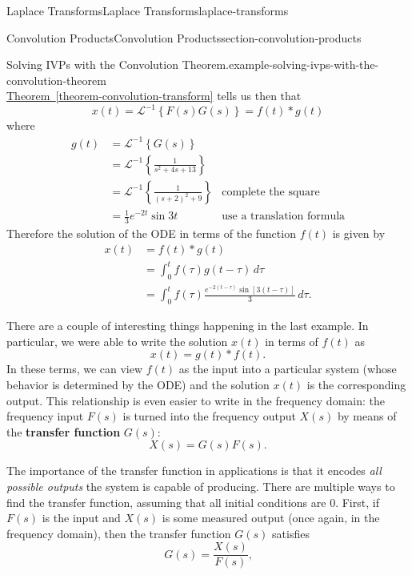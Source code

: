 \documentclass[oneside,10pt,]{book}
\newcommand{\terminology}[1]{\textbf{#1}}
\numberwithin{equation}{section}
\newcommand{\Int}[2]{\int_{#1}^{#2}}
\newcommand{\iLaplace}[1]{\mathcal{L}^{-1}\left\{#1\right\}}
\newcommand{\amp}{&}
\begin{document}
\begin{chapterptx}{Laplace Transforms}{}{Laplace Transforms}{}{}{laplace-transforms}
\begin{sectionptx}{Convolution Products}{}{Convolution Products}{}{}{section-convolution-products}
\begin{example}{Solving IVPs with the Convolution Theorem.}{example-solving-ivps-with-the-convolution-theorem}
\begin{equation*}
\end{equation*}
\hyperref[theorem-convolution-transform]{Theorem~\ref{theorem-convolution-transform}} tells us then that%
\begin{equation*}
x(t) = \iLaplace{F(s)G(s)} = f(t)*g(t)
\end{equation*}
where%
\begin{align*}
g(t) \amp= \iLaplace{G(s)}\\
\amp= \iLaplace{\frac{1}{s^{2}+4s+13}} \\
\amp= \iLaplace{\frac{1}{(s+2)^{2}+9}} \amp \text{complete the square}\\
\amp= \frac{1}{3}e^{-2t}\sin3t \amp \text{use a translation formula}
\end{align*}
Therefore the solution of the ODE in terms of the function \(f(t)\) is given by%
\begin{align*}
x(t) \amp= f(t)\ast g(t)\\
\amp= \Int{0}{t}f(\tau)g(t-\tau)\,d\tau\\
\amp= \int_{0}^{t}f(\tau)\frac{e^{-2(t-\tau)}\sin[3(t-\tau)]}{3}\,d\tau\text{.}
\end{align*}
%
\end{example}
\hypertarget{p-566}{}%
There are a couple of interesting things happening in the last example. In particular, we were able to write the solution \(x(t)\) in terms of \(f(t)\) as%
\begin{equation*}
x(t) = g(t)\ast f(t)\text{.}
\end{equation*}
In these terms, we can view \(f(t)\) as the input into a particular system (whose behavior is determined by the ODE) and the solution \(x(t)\) is the corresponding output. This relationship is even easier to write in the frequency domain: the frequency input \(F(s)\) is turned into the frequency output \(X(s)\) by means of the \terminology{transfer function} \(G(s)\):%
\begin{equation*}
X(s) = G(s)F(s)\text{.}
\end{equation*}
%
\par
\hypertarget{p-567}{}%
The importance of the transfer function in applications is that it encodes \emph{all possible outputs} the system is capable of producing. There are multiple ways to find the transfer function, assuming that all initial conditions are \(0\). First, if \(F(s)\) is the input and \(X(s)\) is some measured output (once again, in the frequency domain), then the transfer function \(G(s)\) satisfies%
\begin{equation*}
G(s) = \frac{X(s)}{F(s)}\text{,}

\end{equation*}
\end{sectionptx}
\end{chapterptx}
\end{document}
